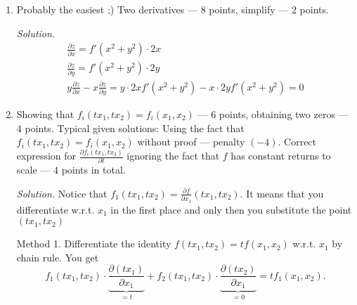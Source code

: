 \begin{enumerate}
\begin{enumerate}
\begin{equation*}
{\begin{array}{cc}
 2 w^2 z+3 z^2 & 1
\end{array}
\right|
} {
\left|
\begin{array}{cc}
 4 w x y+6 x^3 y^3 z^2 & 12 w^2+4 x y z \\
 2 w^2 z+3 z^2 & 3 w^2+2 w z^2
\end{array}
\right|} = -\frac{
\left|
\begin{array}{cc}
 10 & 	10 \\
 5 & 1
\end{array}
\right|
}{
\left|
\begin{array}{cc}
 10 & 16 \\
 5 & 5
\end{array}
\right|
} = -\frac 4 3
\end{equation*}
\end{enumerate}

\item Probably the easiest ;) Two derivatives --- $8$ points, simplify --- $2$ points.

\textit{Solution.}
\begin{equation*}
\begin{array}{l}
\frac{\partial z}{\partial x} = f'(x^2+y^2) \cdot 2x\\
\frac{\partial z}{\partial y} = f'(x^2+y^2) \cdot 2y\\
y\frac{\partial z}{\partial x}-x \frac{\partial z}{\partial y} = y \cdot 2xf'(x^2+y^2) - x \cdot 2y f'(x^2+y^2) =0
\end{array}
\end{equation*}


\item Showing that $f_i(tx_1,tx_2)=f_i(x_1,x_2)$ --- $6$ points, obtaining two zeros --- $4$ points. Typical given solutions: Using the fact that $f_i(tx_1,tx_2)=f_i(x_1,x_2)$ without proof --- penalty $(-4)$. Correct expression for $\frac{\partial f_i(tx_1,tx_2)}{\partial t}$ ignoring the fact that $f$ has constant returns to scale --- $4$ points in total.

\textit{Solution.} Notice that $f_1 (tx_1,tx_2) = \frac{\partial f}{\partial x_1}(tx_1, tx_2).$ It means that you differentiate w.r.t. $x_1$ in the first place and only then you substitute the point $(tx_1, tx_2)$

\noindent Method 1. Differentiate the identity $f(tx_1,tx_2)=tf(x_1,x_2)$ w.r.t. $x_1$ by chain rule. You get
$$
f_1 (tx_1,tx_2)\cdot\underbrace{\frac{\partial (tx_1)}{\partial x_1}}_{=t} +  f_2 (tx_1,tx_2)\cdot\underbrace{\frac{\partial (tx_2)}{\partial x_1}}_{=0} = t f_1(x_1,x_2).
$$


\end{enumerate}
